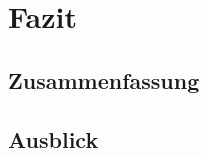\chapter{Fazit}\label{fazit}

\section{Zusammenfassung}\label{fazit:zusammenfassung}

\section{Ausblick}\label{fazit:ausblick}
